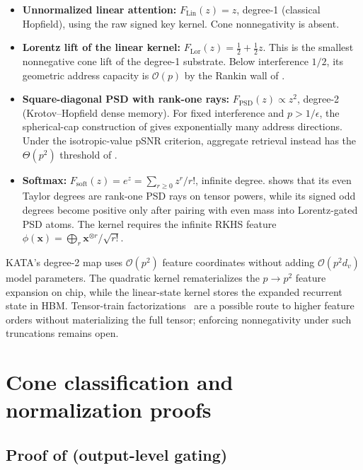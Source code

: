 \documentclass{article}
\newcommand{\1}{\bm{1}}
\def\eps{{\epsilon}}
\def\vx{{\bm{x}}}
\def\gO{{\mathcal{O}}}
\theoremstyle{definition}
\begin{document}
\begin{itemize}
  \item \textbf{Unnormalized linear attention:} $F_\mathrm{Lin}(z)=z$, degree-1 (classical
        Hopfield), using the raw signed key kernel. Cone nonnegativity is absent.
  \item \textbf{Lorentz lift of the linear kernel:} $F_\mathrm{Lor}(z)=\tfrac12+\tfrac12z$.
        This is the smallest nonnegative cone lift of the degree-1 substrate. Below interference
        $1/2$, its geometric address capacity is $\gO(p)$ by the Rankin wall of .
  \item \textbf{Square-diagonal PSD with rank-one rays:} $F_\mathrm{PSD}(z)\propto z^2$, degree-2
        (Krotov--Hopfield dense memory). For fixed interference and $p>1/\eps$, the spherical-cap
        construction of  gives exponentially many address directions. Under the
        isotropic-value pSNR criterion, aggregate retrieval instead has the $\Theta(p^2)$ threshold
        of .
  \item \textbf{Softmax:} $F_\mathrm{soft}(z) = e^z = \sum_{r\ge 0} z^r/r!$, infinite degree.
         shows that its even Taylor degrees are rank-one PSD rays on
        tensor powers, while its signed odd degrees become positive only after pairing with even
        mass into Lorentz-gated PSD atoms. The kernel requires the infinite RKHS feature
        $\phi(\vx) = \bigoplus_r \vx^{\otimes r}/\sqrt{r!}$.
\end{itemize}

KATA's degree-2 map uses $\gO(p^2)$ feature coordinates without adding $\gO(p^2d_v)$ model
parameters. The quadratic kernel rematerializes the $p\to p^2$ feature expansion on chip, while
the linear-state kernel stores the expanded recurrent state in HBM. Tensor-train
factorizations~\citep{oseledets11tt} are a possible route to higher feature orders without
materializing the full tensor; enforcing nonnegativity under such truncations remains open.


\section{Cone classification and normalization proofs}
\label{app:cone-proofs}

\subsection{\texorpdfstring{Proof of  (output-level gating)}{Proof of output-level gating}}
\end{document}
